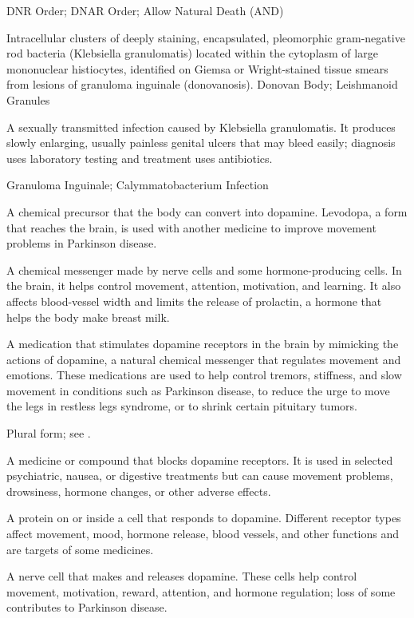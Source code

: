 \synonyms
DNR Order; DNAR Order; Allow Natural Death (AND)

 Intracellular clusters of deeply staining, encapsulated, pleomorphic gram-negative rod bacteria (Klebsiella granulomatis) located within the cytoplasm of large mononuclear histiocytes, identified on Giemsa or Wright-stained tissue smears from lesions of granuloma inguinale (donovanosis).
\synonyms
Donovan Body; Leishmanoid Granules

 A sexually transmitted infection caused by Klebsiella granulomatis. It produces slowly enlarging, usually painless genital ulcers that may bleed easily; diagnosis uses laboratory testing and treatment uses antibiotics.

\synonyms
Granuloma Inguinale; Calymmatobacterium Infection

 A chemical precursor that the body can convert into dopamine. Levodopa, a form that reaches the brain, is used with another medicine to improve movement problems in Parkinson disease.

 A chemical messenger made by nerve cells and some
hormone-producing cells. In the brain, it helps control movement, attention,
motivation, and learning. It also affects blood-vessel width and limits the
release of prolactin, a hormone that helps the body make breast milk.

 A medication that stimulates dopamine receptors in the brain by mimicking the actions of dopamine, a natural chemical messenger that regulates movement and emotions. These medications are used to help control tremors, stiffness, and slow movement in conditions such as Parkinson disease, to reduce the urge to move the legs in restless legs syndrome, or to shrink certain pituitary tumors.

 Plural form; see .

 A medicine or compound that blocks dopamine receptors. It is used in selected psychiatric, nausea, or digestive treatments but can cause movement problems, drowsiness, hormone changes, or other adverse effects.

 A protein on or inside a cell that responds to dopamine. Different receptor types affect movement, mood, hormone release, blood vessels, and other functions and are targets of some medicines.

 A nerve cell that makes and releases dopamine. These cells help control movement, motivation, reward, attention, and hormone regulation; loss of some contributes to Parkinson disease.

